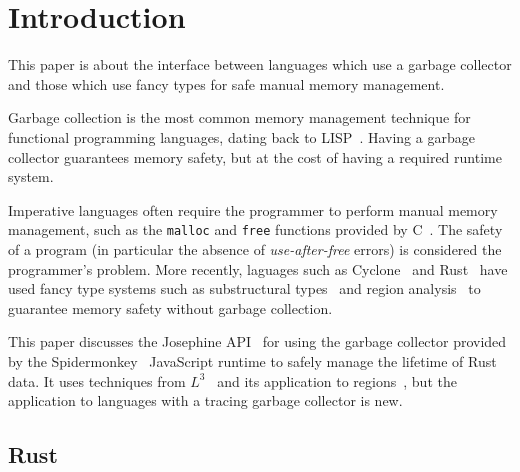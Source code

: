 \section{Introduction}

This paper is about the interface between languages
which use a garbage collector and those which use fancy
types for safe manual memory management.

Garbage collection is the most common memory management technique for
functional programming languages, dating back to LISP~\cite{LISP}.
Having a garbage collector guarantees memory safety, but at the
cost of having a required runtime system.

Imperative languages often require the programmer to perform
manual memory management, such as the \verb|malloc| and \verb|free|
functions provided by C~\cite{K+R}. The safety of a program
(in particular the absence of \emph{use-after-free} errors)
is considered the programmer's problem.
More recently, laguages such as Cyclone~\cite{cyclone}
and Rust~\cite{rust} have used fancy type systems
such as substructural types~\cite{girard,Go4,walker}
and region analysis~\cite{regions} to guarantee memory
safety without garbage collection.

This paper discusses the Josephine API~\cite{josephine} for using the
garbage collector provided by the Spidermonkey~\cite{spidermonkey}
JavaScript runtime to safely manage the lifetime of Rust~\cite{rust}
data. It uses techniques from $L^3$~\cite{l3} and its application
to regions~\cite{l3-with-regions}, but the application to languages
with a tracing garbage collector is new.

\subsection{Rust}

